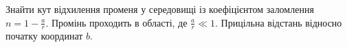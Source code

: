 \begin{problem}
Знайти кут відхилення променя у середовищі із коефіцієнтом заломлення $n = 1 - \frac{a}{r}$. Промінь
проходить в області, де  $\frac{a}{r} \ll 1$. Прицільна відстань відносно початку координат $b$.
\end{problem}


